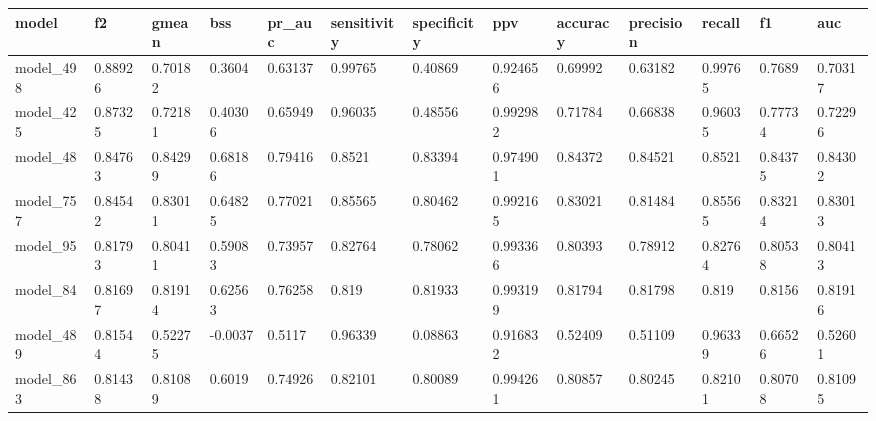 \begin{tabular}{|l|l|l|l|l|l|l|l|l|l|l|l|l|}
\hline
\textbf{model} & \textbf{f2} & \textbf{gmean} & \textbf{bss} & \textbf{pr\_auc} & \textbf{sensitivity} & \textbf{specificity} & \textbf{ppv} & \textbf{accuracy} & \textbf{precision} & \textbf{recall} & \textbf{f1} & \textbf{auc} \\ \hline
model\_498     & 0.88926     & 0.70182        & 0.3604       & 0.63137          & 0.99765              & 0.40869              & 0.924656     & 0.69992           & 0.63182            & 0.99765         & 0.7689      & 0.70317      \\ \hline
model\_425     & 0.87325     & 0.72181        & 0.40306      & 0.65949          & 0.96035              & 0.48556              & 0.992982     & 0.71784           & 0.66838            & 0.96035         & 0.77734     & 0.72296      \\ \hline
model\_48      & 0.84763     & 0.84299        & 0.68186      & 0.79416          & 0.8521               & 0.83394              & 0.974901     & 0.84372           & 0.84521            & 0.8521          & 0.84375     & 0.84302      \\ \hline
model\_757     & 0.84542     & 0.83011        & 0.64825      & 0.77021          & 0.85565              & 0.80462              & 0.992165     & 0.83021           & 0.81484            & 0.85565         & 0.83214     & 0.83013      \\ \hline
model\_95      & 0.81793     & 0.80411        & 0.59083      & 0.73957          & 0.82764              & 0.78062              & 0.993366     & 0.80393           & 0.78912            & 0.82764         & 0.80538     & 0.80413      \\ \hline
model\_84      & 0.81697     & 0.81914        & 0.62563      & 0.76258          & 0.819                & 0.81933              & 0.993199     & 0.81794           & 0.81798            & 0.819           & 0.8156      & 0.81916      \\ \hline
model\_489     & 0.81544     & 0.52275        & -0.0037      & 0.5117           & 0.96339              & 0.08863              & 0.916832     & 0.52409           & 0.51109            & 0.96339         & 0.66526     & 0.52601      \\ \hline
model\_863     & 0.81438     & 0.81089        & 0.6019       & 0.74926          & 0.82101              & 0.80089              & 0.994261     & 0.80857           & 0.80245            & 0.82101         & 0.80708     & 0.81095      \\ \hline

\end{tabular}

